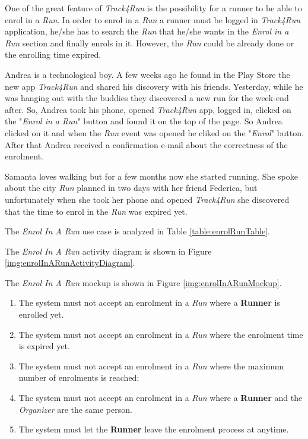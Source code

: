 One of the great feature of \textit{Track4Run} is the possibility for a runner to be able to enrol in a \textit{Run}.
In order to enrol in a \textit{Run} a runner must be logged in \textit{Track4Run} application, he/she has to search the \textit{Run} that he/she wants in the \textit{Enrol in a Run} section and finally enrols in it.
However, the \textit{Run} could be already done or the enrolling time expired.

Andrea is a technological boy. A few weeks ago he found in the Play Store the new app \textit{Track4Run} and shared his discovery with his friends. Yesterday, while he was hanging out with the buddies they discovered a new run for the week-end after.
So, Andrea took his phone, opened \textit{Track4Run} app, logged in, clicked on the "\textit{Enrol in a Run}" button and found it on the top of the page. So Andrea clicked on it and when the \textit{Run} event was opened he cliked on the "\textit{Enrol}" button.
After that Andrea received a confirmation e-mail about the correctness of the enrolment.

Samanta loves walking but for a few months now she started running. She spoke about the city \textit{Run} planned in two days with her friend Federica, but unfortunately when she took her phone and opened \textit{Track4Run} she discovered that the time to enrol in the \textit{Run} was expired yet.

The \textit{Enrol In A Run} use case is analyzed in Table \ref{table:enrolRunTable}.

The \textit{Enrol In A Run} activity diagram is shown in Figure \ref{img:enrolInARunActivityDiagram}.

The \textit{Enrol In A Run} mockup is shown in Figure \ref{img:enrolInARunMockup}.

\begin{enumerate}
  \item The system must not accept an enrolment in a \textit{Run} where a \textbf{Runner} is enrolled yet.
  \item The system must not accept an enrolment in a \textit{Run} where the enrolment time is expired yet.
  \item The system must not accept an enrolment in a \textit{Run} where the maximum number of enrolments is reached;
  \item The system must not accept an enrolment in a \textit{Run} where a \textbf{Runner} and the \textit{Organizer} are the same person.
  \item The system must let the \textbf{Runner} leave the enrolment process at anytime.
\end{enumerate}

